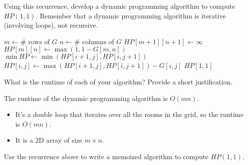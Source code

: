 \documentclass[11pt,fleqn]{exam}
\newenvironment{soln}{\color{solnblue}}{}
\newif\ifsolutions\solutionstrue
\newif\ifsolutions\solutionsfalse
\begin{document}
\begin{questions}
\question[5]
Using this recurrence, 
develop a dynamic programming algorithm  to compute $HP(1,1)$. Remember that a dynamic programming algorithm is iterative (involving loops), not recursive.

\begin{soln}
   \begin{algorithmic}[1]
         \State $m \gets \text{# rows of } G$
         \State $n \gets \text{# columns of } G$
         \State $HP[m+1][n+1] \gets \infty$
         \State $HP[m][n] \gets \max(1, 1 - G[m,n])$
               \State $\min HP \gets \min(HP[i+1,j], HP[i,j+1])$
               \State $HP[i,j] \gets \max(HP[i+1,j], HP[i,j+1]) - G[i,j]$
               \EndIf
            \EndFor
         \EndFor
         \State \Return $HP[1,1]$
      \EndFunction
   \end{algorithmic}
\end{soln}


\ifsolutions

\else
\fi

\question[2]
What is the runtime of each of your algorithm?  Provide a short justification.

\begin{soln}
   The runtime of the dynamic programming algorithm is $O(mn)$.
   \begin{itemize}
      \item It's a double loop that iterates over all the rooms in the grid, so the runtime is $O(mn)$.
      \item It is a 2D array of size $m \times n$.
   \end{itemize}
\end{soln}

\ifsolutions

\else
\fi

\question[Optional: 0]
 Use the recurrence above to write a memoized algorithm to compute $HP(1,1)$.
\end{questions}
\end{document}
